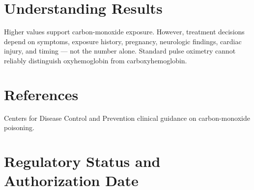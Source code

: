\section*{Understanding Results}
Higher values support carbon-monoxide exposure. However, treatment decisions depend on symptoms, exposure history, pregnancy, neurologic findings, cardiac injury, and timing --- not the number alone. Standard pulse oximetry cannot reliably distinguish oxyhemoglobin from carboxyhemoglobin.

\section*{References}
Centers for Disease Control and Prevention clinical guidance on carbon-monoxide poisoning.

\clearpage


\section*{Regulatory Status and Authorization Date}

\clearpage
